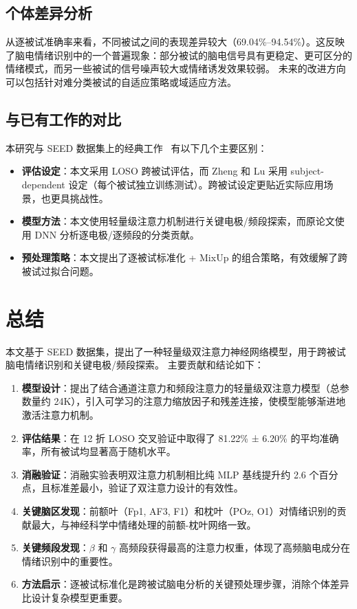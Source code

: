 \documentclass[12pt,a4paper]{ctexart}
\begin{document}
\subsection{个体差异分析}

从逐被试准确率来看，不同被试之间的表现差异较大（69.04\%--94.54\%）。这反映了脑电情绪识别中的一个普遍现象：部分被试的脑电信号具有更稳定、更可区分的情绪模式，而另一些被试的信号噪声较大或情绪诱发效果较弱。
未来的改进方向可以包括针对难分类被试的自适应策略或域适应方法。

\subsection{与已有工作的对比}

本研究与 SEED 数据集上的经典工作~\cite{zheng2015} 有以下几个主要区别：
\begin{itemize}[itemsep=0pt]
    \item \textbf{评估设定}：本文采用 LOSO 跨被试评估，而 Zheng 和 Lu 采用 subject-dependent 设定（每个被试独立训练测试）。跨被试设定更贴近实际应用场景，也更具挑战性。
    \item \textbf{模型方法}：本文使用轻量级注意力机制进行关键电极/频段探索，而原论文使用 DNN 分析逐电极/逐频段的分类贡献。
    \item \textbf{预处理策略}：本文提出了逐被试标准化 + MixUp 的组合策略，有效缓解了跨被试过拟合问题。
\end{itemize}


\section{总结}

本文基于 SEED 数据集，提出了一种轻量级双注意力神经网络模型，用于跨被试脑电情绪识别和关键电极/频段探索。
主要贡献和结论如下：

\begin{enumerate}[itemsep=0pt]
    \item \textbf{模型设计}：提出了结合通道注意力和频段注意力的轻量级双注意力模型（总参数量约 24K），引入可学习的注意力缩放因子和残差连接，使模型能够渐进地激活注意力机制。
    \item \textbf{评估结果}：在 12 折 LOSO 交叉验证中取得了 81.22\% ± 6.20\% 的平均准确率，所有被试均显著高于随机水平。
    \item \textbf{消融验证}：消融实验表明双注意力机制相比纯 MLP 基线提升约 2.6 个百分点，且标准差最小，验证了双注意力设计的有效性。
    \item \textbf{关键脑区发现}：前额叶（Fp1, AF3, F1）和枕叶（POz, O1）对情绪识别的贡献最大，与神经科学中情绪处理的前额-枕叶网络一致。
    \item \textbf{关键频段发现}：$\beta$ 和 $\gamma$ 高频段获得最高的注意力权重，体现了高频脑电成分在情绪识别中的重要性。
    \item \textbf{方法启示}：逐被试标准化是跨被试脑电分析的关键预处理步骤，消除个体差异比设计复杂模型更重要。
\end{enumerate}
\end{document}
